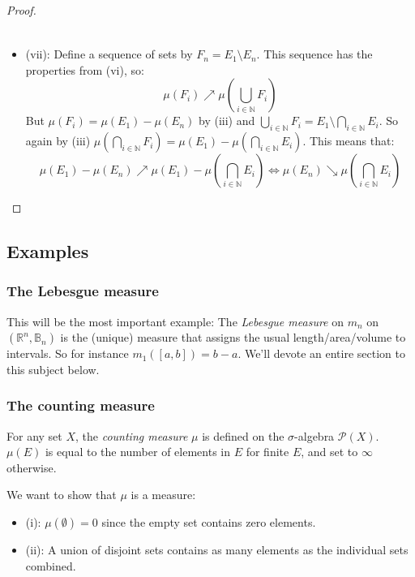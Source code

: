 \documentclass[12pt, a4paper]{article}
\numberwithin{equation}{section}
\begin{document}
\begin{proof}
\begin{itemize}
\begin{align}
\end{align}
\item (vii): Define a sequence of sets by $F_n=E_1\setminus E_n$. This sequence has the properties from (vi), so:
\begin{equation}
\mu(F_i)\nearrow\mu\left(\bigcup_{i\in\mathbb{N}}F_i\right)
\end{equation}
But $\mu(F_i)=\mu(E_1)-\mu(E_n)$ by (iii) and $\bigcup_{i\in\mathbb{N}}F_i=E_1\setminus\bigcap_{i\in\mathbb{N}}E_i$. So again by (iii) $\mu(\bigcap_{i\in\mathbb{N}}F_i)=\mu(E_1)-\mu\left(\bigcap_{i\in\mathbb{N}}E_i\right)$. This means that:
\begin{equation}
\mu(E_1)-\mu(E_n)\nearrow\mu(E_1)-\mu\left(\bigcap_{i\in\mathbb{N}}E_i\right)\Leftrightarrow\mu(E_n)\searrow\mu\left(\bigcap_{i\in\mathbb{N}}E_i\right)
\end{equation}
\end{itemize}
\end{proof}

\subsection{Examples}

\subsubsection{The Lebesgue measure}
This will be the most important example: The \textit{Lebesgue measure} on $m_n$ on $(\mathbb{R}^n,\mathbb{B}_n)$ is the (unique) measure that assigns the usual length/area/volume to intervals. So for instance $m_1([a,b])=b-a$. We'll devote an entire section to this subject below.

\subsubsection{The counting measure}
For any set $X$, the \textit{counting measure} $\mu$ is defined on the $\sigma$-algebra $\mathcal{P}(X)$. $\mu(E)$ is equal to the number of elements in $E$ for finite $E$, and set to $\infty$ otherwise.

We want to show that $\mu$ is a measure:
\begin{itemize}
\item (i): $\mu(\emptyset)=0$ since the empty set contains zero elements.
\item (ii): A union of disjoint sets contains as many elements as the individual sets combined.
\end{itemize}
\end{document}
